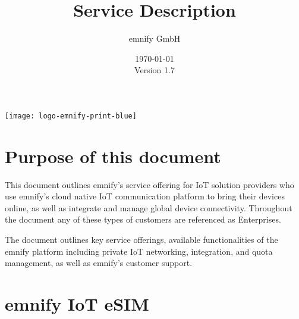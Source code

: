 \documentclass[11pt, oneside]{article}   	%
\newcommand{\addspace}{\vspace{2mm}}
\begin{document}
\title{Service Description}
\author{emnify GmbH}
\date{\today \\ \addspace Version 1.7}
\maketitle

\begin{center}
  \texttt{[image: logo-emnify-print-blue]}
\end{center}

\pagebreak[4]

\tableofcontents

\pagebreak[4]

\section{Purpose of this document}

\begin{markdown}

This document outlines emnify's service offering for IoT solution providers who use emnify's cloud native IoT communication platform to bring their devices online, as well as integrate and manage global device connectivity.
Throughout the document any of these types of customers are referenced as Enterprises. 

The document outlines key service offerings, available functionalities of the emnify platform including private IoT networking, integration, and quota management, as well as emnify's customer support.  

\end{markdown}

\section{emnify IoT eSIM}
\end{document}
